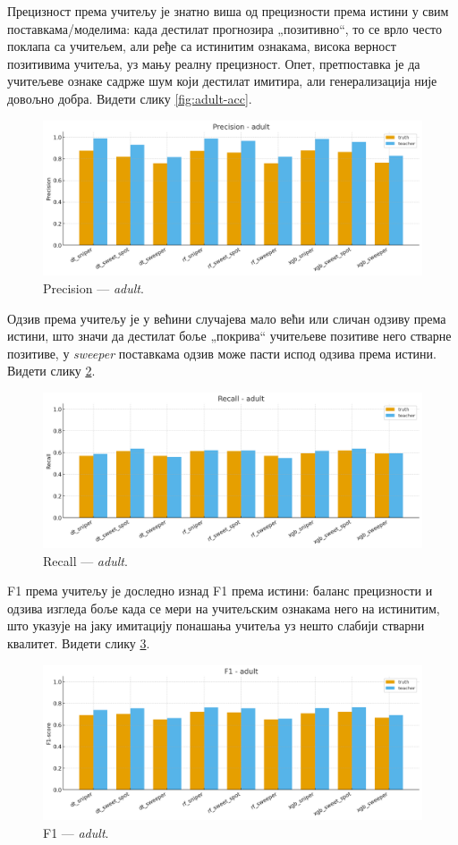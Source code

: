 Прецизност према учитељу је знатно виша од прецизности према истини у свим поставкама/моделима: када дестилат прогнозира „позитивно“, то се врло често поклапа са учитељем, али ређе са истинитим ознакама, висока верност позитивима учитеља, уз мању реалну прецизност. Опет, претпоставка је да учитељеве ознаке садрже шум који дестилат имитира, али генерализација није довољно добра. Видети слику \ref{fig:adult-acc}.
\begin{figure}[H]
  \centering
  \includegraphics[width=.85\linewidth]{images/charts/precision_simple_adult.png}
  \caption{Precision — \textit{adult}.}
  \label{fig:adult-prec}
\end{figure}

Одзив према учитељу је у већини случајева мало већи или сличан одзиву према истини, што значи да дестилат боље „покрива“ учитељеве позитиве него стварне позитиве, у \textit{sweeper} поставкама одзив може пасти испод одзива према истини. Видети слику \ref{fig:adult-recall}.
\begin{figure}[H]
  \centering
  \includegraphics[width=.85\linewidth]{images/charts/recall_simple_adult.png}
  \caption{Recall — \textit{adult}.}
  \label{fig:adult-recall}
\end{figure}

F1 према учитељу је доследно изнад F1 према истини: баланс прецизности и одзива изгледа боље када се мери на учитељским ознакама него на истинитим, што указује на јаку имитацију понашања учитеља уз нешто слабији стварни квалитет. Видети слику \ref{fig:adult-f1}.
\begin{figure}[H]
  \centering
  \includegraphics[width=.85\linewidth]{images/charts/f1_simple_adult.png}
  \caption{F1 — \textit{adult}.}
  \label{fig:adult-f1}
\end{figure}


